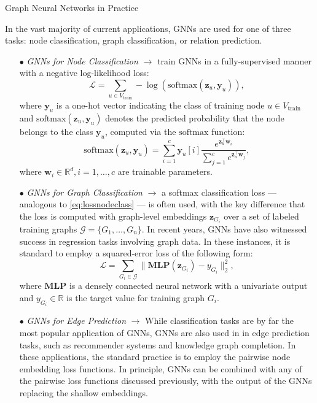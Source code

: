 \documentclass[10pt, aspectratio=169, compress, protectframetitle, handout]{beamer}
\begin{document}
\begin{frame}[allowframebreaks]{Graph Neural Networks in Practice}

    In the vast majority of current applications, GNNs are used for one of three tasks: node classification, graph classification, or relation prediction.
    \begin{itemize}
        \item[\alert{$\bullet$}] \emph{GNNs for Node Classification} $\rightarrow$ train GNNs in a fully-supervised manner with a negative log-likelihood loss:
        \begin{equation}
            \mathcal L = \sum_{u \in V_\text{train}} -\log(\text{softmax}(\mathbf z_u, \mathbf y_u)),
        \end{equation}
        where $\mathbf y_u$ is a one-hot vector indicating the class of training node $u \in V_\text{train}$ and $\text{softmax}(\mathbf z_u, \mathbf y_u)$ denotes the predicted probability that the node belongs to the class $\mathbf y_u$, computed via the $\text{softmax}$ function:
        \begin{equation}
            \text{softmax}(\mathbf z_u, \mathbf y_u) = \sum^c_{i=1} \mathbf y_u[i] \frac{e^{\mathbf z_u^\top \mathbf w_i}}{\sum^c_{j=1} e^{\mathbf z_u^\top \mathbf w_j}},
            \label{eq:lossnodeclass}
        \end{equation}
        where $\mathbf w_i \in \mathbb R^d, i = 1, \ldots, c$ are trainable parameters.
        
        \item[\alert{$\bullet$}] \emph{GNNs for Graph Classification} $\rightarrow$ a softmax classification loss --- analogous to \autoref{eq:lossnodeclass} --- is often used, with the key difference that the loss is computed with graph-level embeddings $\mathbf z_{G_i}$ over a set of labeled training graphs $\mathcal G = \{G_1, \ldots, G_n\}$. In recent years, GNNs have also witnessed success in regression tasks involving graph data. In these instances, it is standard to employ a squared-error loss of the following form:
        \begin{equation}
            \mathcal L = \sum_{G_i \in \mathcal G} \| \textbf{MLP}(\mathbf z_{G_i}) - y_{G_i}\|_2^2,
        \end{equation}
        where $\textbf{MLP}$ is a densely connected neural network with a univariate output and $y_{G_i} \in \mathbb R$ is the target value for training graph $G_i$.
        
        \item[\alert{$\bullet$}] \emph{GNNs for Edge Prediction} $\rightarrow$ While classification tasks are by far the most popular application of GNNs, GNNs are also used in in edge prediction tasks, such as recommender systems and knowledge graph completion. In these applications, the standard practice is to employ the pairwise node embedding loss functions. In principle, GNNs can be combined with any of the pairwise loss functions discussed previously, with the output of the GNNs replacing the shallow embeddings.
    \end{itemize}
\end{frame}
\end{document}
